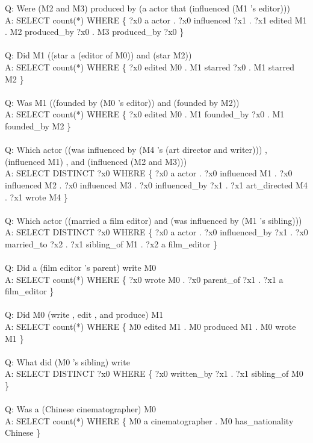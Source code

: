 \documentclass{article} \usepackage{iclr2022_conference,times}
\newcommand{\prompt}[1]{{\footnotesize \textsf{#1}}}
\begin{document}
\prompt{Q: Were (M2 and M3) produced by (a actor that (influenced (M1 's editor))) \\
A: SELECT count(*) WHERE \{ ?x0 a actor . ?x0 influenced ?x1 . ?x1 edited M1 . M2 produced\_by ?x0 . M3 produced\_by ?x0 \} \\
 \\
Q: Did M1 ((star a (editor of M0)) and (star M2)) \\
A: SELECT count(*) WHERE \{ ?x0 edited M0 . M1 starred ?x0 . M1 starred M2 \} \\
 \\
Q: Was M1 ((founded by (M0 's editor)) and (founded by M2)) \\
A: SELECT count(*) WHERE \{ ?x0 edited M0 . M1 founded\_by ?x0 . M1 founded\_by M2 \} \\
 \\
Q: Which actor ((was influenced by (M4 's (art director and writer))) , (influenced M1) , and (influenced (M2 and M3))) \\
A: SELECT DISTINCT ?x0 WHERE \{ ?x0 a actor . ?x0 influenced M1 . ?x0 influenced M2 . ?x0 influenced M3 . ?x0 influenced\_by ?x1 . ?x1 art\_directed M4 . ?x1 wrote M4 \} \\
 \\
Q: Which actor ((married a film editor) and (was influenced by (M1 's sibling))) \\
A: SELECT DISTINCT ?x0 WHERE \{ ?x0 a actor . ?x0 influenced\_by ?x1 . ?x0 married\_to ?x2 . ?x1 sibling\_of M1 . ?x2 a film\_editor \} \\
 \\
Q: Did a (film editor 's parent) write M0 \\
A: SELECT count(*) WHERE \{ ?x0 wrote M0 . ?x0 parent\_of ?x1 . ?x1 a film\_editor \} \\
 \\
Q: Did M0 (write , edit , and produce) M1 \\
A: SELECT count(*) WHERE \{ M0 edited M1 . M0 produced M1 . M0 wrote M1 \} \\
 \\
Q: What did (M0 's sibling) write \\
A: SELECT DISTINCT ?x0 WHERE \{ ?x0 written\_by ?x1 . ?x1 sibling\_of M0 \} \\
 \\
Q: Was a (Chinese cinematographer) M0 \\
A: SELECT count(*) WHERE \{ M0 a cinematographer . M0 has\_nationality Chinese \} \\
 \\
}
\end{document}
